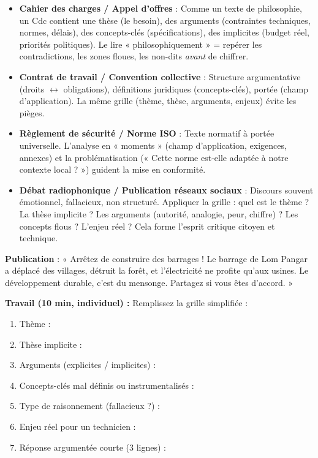 \documentclass[11pt]{article}
\begin{document}
\begin{savaistu}
\begin{itemize}
\item \textbf{Cahier des charges / Appel d'offres} : Comme un texte de philosophie, un Cdc contient une thèse (le besoin), des arguments (contraintes techniques, normes, délais), des concepts-clés (spécifications), des implicites (budget réel, priorités politiques). Le lire « philosophiquement » = repérer les contradictions, les zones floues, les non-dits \emph{avant} de chiffrer.
\item \textbf{Contrat de travail / Convention collective} : Structure argumentative (droits $\leftrightarrow$ obligations), définitions juridiques (concepts-clés), portée (champ d'application). La même grille (thème, thèse, arguments, enjeux) évite les pièges.
\item \textbf{Règlement de sécurité / Norme ISO} : Texte normatif à portée universelle. L'analyse en « moments » (champ d'application, exigences, annexes) et la problématisation (« Cette norme est-elle adaptée à notre contexte local ? ») guident la mise en conformité.
\item \textbf{Débat radiophonique / Publication réseaux sociaux} : Discours souvent émotionnel, fallacieux, non structuré. Appliquer la grille : quel est le thème ? La thèse implicite ? Les arguments (autorité, analogie, peur, chiffre) ? Les concepts flous ? L'enjeu réel ? Cela forme l'esprit critique citoyen et technique.
\end{itemize}
\end{savaistu}

\begin{exemplebox}
\textbf{Publication} : « Arrêtez de construire des barrages ! Le barrage de Lom Pangar a déplacé des villages, détruit la forêt, et l'électricité ne profite qu'aux usines. Le développement durable, c'est du mensonge. Partagez si vous êtes d'accord. »

\textbf{Travail (10 min, individuel) :} Remplissez la grille simplifiée :
\begin{enumerate}
\item Thème :
\item Thèse implicite :
\item Arguments (explicites / implicites) :
\item Concepts-clés mal définis ou instrumentalisés :
\item Type de raisonnement (fallacieux ?) :
\item Enjeu réel pour un technicien :
\item Réponse argumentée courte (3 lignes) :
\end{enumerate}
\end{exemplebox}
\end{document}
